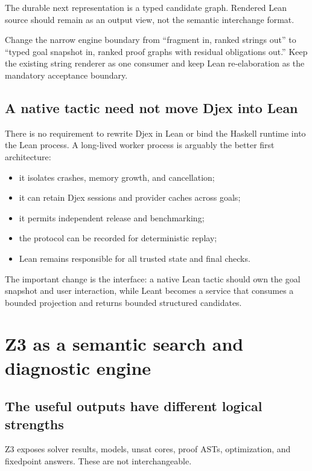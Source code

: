 \documentclass[11pt,letterpaper,openany]{report}
\begin{document}
The durable next representation is a typed candidate graph. Rendered Lean source
should remain as an output view, not the semantic interchange format.

\begin{designbox}[title=Most important Leant evolution]
Change the narrow engine boundary from ``fragment in, ranked strings out'' to
``typed goal snapshot in, ranked proof graphs with residual obligations out.'' Keep
the existing string renderer as one consumer and keep Lean re-elaboration as the
mandatory acceptance boundary.
\end{designbox}

\section{A native tactic need not move Djex into Lean}

There is no requirement to rewrite Djex in Lean or bind the Haskell runtime into the
Lean process. A long-lived worker process is arguably the better first architecture:

\begin{itemize}
  \item it isolates crashes, memory growth, and cancellation;
  \item it can retain Djex sessions and provider caches across goals;
  \item it permits independent release and benchmarking;
  \item the protocol can be recorded for deterministic replay;
  \item Lean remains responsible for all trusted state and final checks.
\end{itemize}

The important change is the interface: a native Lean tactic should own the goal
snapshot and user interaction, while Leant becomes a service that consumes a bounded
projection and returns bounded structured candidates.

\chapter{Z3 as a semantic search and diagnostic engine}
\label{ch:z3}

\section{The useful outputs have different logical strengths}

Z3 exposes solver results, models, unsat cores, proof ASTs, optimization, and
fixedpoint answers. These are not interchangeable.
\end{document}
